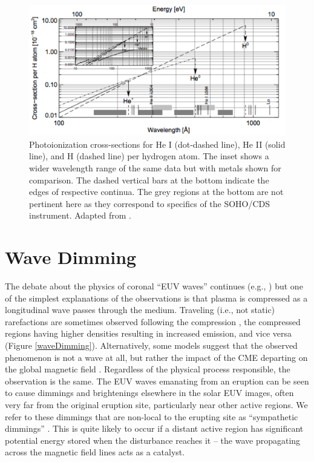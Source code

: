 \begin{figure}[!h]
    \caption[Photoionization cross-sections for H and He]{
        Photoionization cross-sections for He I (dot-dashed line), He II (solid line), and H (dashed line) per hydrogen
        atom. The inset shows a wider wavelength range of the same data but with metals shown for comparison. The dashed
        vertical bars at the bottom indicate the edges of respective continua. The grey regions at the bottom are not 
        pertinent here as they correspond to specifics of the SOHO/CDS instrument. Adapted from \citet{Andretta2003}. 
    }
    \begin{center}
        \includegraphics[width=150mm]{Images/PhotoionizationCrossSection.png}
    \end{center}
    \label{photoionizationCrossSection}
\end{figure}

\section{Wave Dimming}
\label{sec:waveDimming}
The debate about the physics of coronal “EUV waves” continues (e.g., \citealt{Zhukov2004, Muhr2011, Liu2014}) but one of the simplest explanations of the observations is that plasma is compressed as a longitudinal wave passes through the medium. Traveling (i.e., not static) rarefactions are sometimes observed following the compression \citep{Muhr2011}, the compressed regions having higher densities resulting in increased emission, and vice versa (Figure \ref{waveDimming}). Alternatively, some models suggest that the observed phenomenon is not a wave at all, but rather the impact of the CME departing on the global magnetic field \citep{Chen2002, Chen2005}. Regardless of the physical process responsible, the observation is the same. The EUV waves emanating from an eruption can be seen to cause dimmings and brightenings elsewhere in the solar EUV images, often very far from the original eruption site, particularly near other active regions. We refer to these dimmings that are non-local to the erupting site as “sympathetic dimmings” \citep{Schrijver2015}. This is quite likely to occur if a distant active region has significant potential energy stored when the disturbance reaches it -- the wave propagating across the magnetic field lines acts as a catalyst. 

